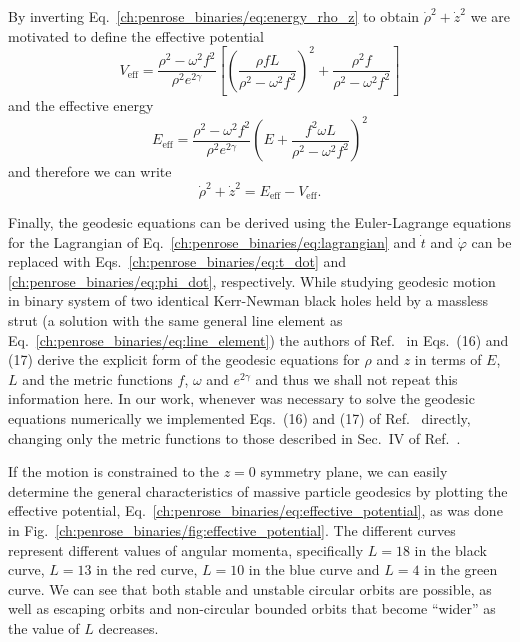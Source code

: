 By inverting Eq.~\eqref{ch:penrose_binaries/eq:energy_rho_z} to obtain $\dot{\rho}^2 + \dot{z}^2$ we are motivated to define the effective potential
%
\begin{equation}
  V_{\text{eff}} = \frac{\rho^2 - \omega^2 f^2}{\rho^2 e^{2\gamma}}\left[ \left( \frac{\rho fL}{\rho^2 - \omega^2f^2} \right)^2 + \frac{\rho^2f}{\rho^2 - \omega^2f^2}\right]
  \label{ch:penrose_binaries/eq:effective_potential}
\end{equation}
%
and the effective energy
%
\begin{equation}
  E_{\text{eff}} = \frac{\rho^2 - \omega^2 f^2}{\rho^2 e^{2\gamma}}\left(E + \frac{f^2\omega L}{\rho^2-\omega^2 f^2}\right)^2
  \label{ch:penrose_binaries/eq:effective_energy}
\end{equation}
%
and therefore we can write
%
\begin{equation}
  \dot{\rho}^2 + \dot{z}^2 = E_{\text{eff}} - V_{\text{eff}}.
  \label{ch:penrose_binaries/eq:effective_potential_motion}
\end{equation}

Finally, the geodesic equations can be derived using the Euler-Lagrange equations for the Lagrangian of Eq.~\eqref{ch:penrose_binaries/eq:lagrangian} and $\dot{t}$ and $\dot{\varphi}$ can be replaced with Eqs.~\eqref{ch:penrose_binaries/eq:t_dot} and \eqref{ch:penrose_binaries/eq:phi_dot}, respectively. While studying geodesic motion in binary system of two identical Kerr-Newman black holes held by a massless strut (a solution with the same general line element as Eq.~\eqref{ch:penrose_binaries/eq:line_element}) the authors of Ref.~\cite{Dubeibe2016} in Eqs.~(16) and (17) derive the explicit form of the geodesic equations for $\rho$ and $z$ in terms of $E$, $L$ and the metric functions $f$, $\omega$ and $e^{2\gamma}$ and thus we shall not repeat this information here. In our work, whenever was necessary to solve the geodesic equations numerically we implemented Eqs.~(16) and (17) of Ref.~\cite{Dubeibe2016} directly, changing only the metric functions to those described in  Sec.~IV of Ref.~\cite{MANKO2020}.

If the motion is constrained to the $z=0$ symmetry plane, we can easily determine the general characteristics of massive particle geodesics by plotting the effective potential, Eq.~\eqref{ch:penrose_binaries/eq:effective_potential}, as was done in Fig.~\ref{ch:penrose_binaries/fig:effective_potential}. The different curves represent different values of angular momenta, specifically $L = 18$ in the black curve, $L = 13$ in the red curve, $L=10$ in the blue curve and $L=4$ in the green curve. We can see that both stable and unstable circular orbits are possible, as well as escaping orbits and non-circular bounded orbits that become ``wider'' as the value of $L$ decreases.

